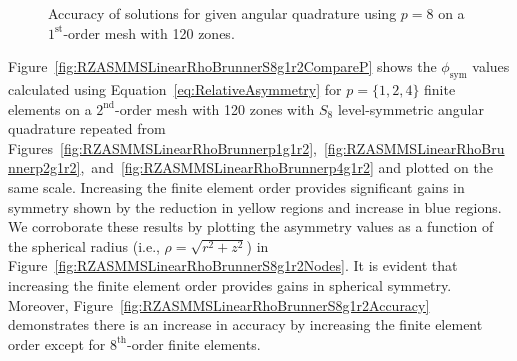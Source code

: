 \documentclass[12pt]{article}
\begin{document}
\begin{figure}[!htb]
\centering
{}
\caption{Accuracy of solutions for given angular quadrature using $p=8$ on a $1^\text{st}$-order mesh with 120 zones.}
\label{fig:RZASMMSLinearRhoBrunnerp8g1r2Accuracy}
\end{figure}

\FloatBarrier

Figure~\ref{fig:RZASMMSLinearRhoBrunnerS8g1r2CompareP} shows the $\phi_\text{sym}$ values calculated using Equation~\ref{eq:RelativeAsymmetry} for $p=\{1,2,4\}$ finite elements on a $2^\text{nd}$-order mesh with 120 zones with $S_8$ level-symmetric angular quadrature repeated from Figures~\ref{fig:RZASMMSLinearRhoBrunnerp1g1r2},~\ref{fig:RZASMMSLinearRhoBrunnerp2g1r2},~and~\ref{fig:RZASMMSLinearRhoBrunnerp4g1r2} and plotted on the same scale. Increasing the finite element order provides significant gains in symmetry shown by the reduction in yellow regions and increase in blue regions. We corroborate these results by plotting the asymmetry values as a function of the spherical radius (i.e., $\rho=\sqrt{r^2+z^2}$) in Figure~\ref{fig:RZASMMSLinearRhoBrunnerS8g1r2Nodes}. It is evident that increasing the finite element order provides gains in spherical symmetry. Moreover, Figure~\ref{fig:RZASMMSLinearRhoBrunnerS8g1r2Accuracy} demonstrates there is an increase in accuracy by increasing the finite element order except for $8^\text{th}$-order finite elements.
\end{document}
